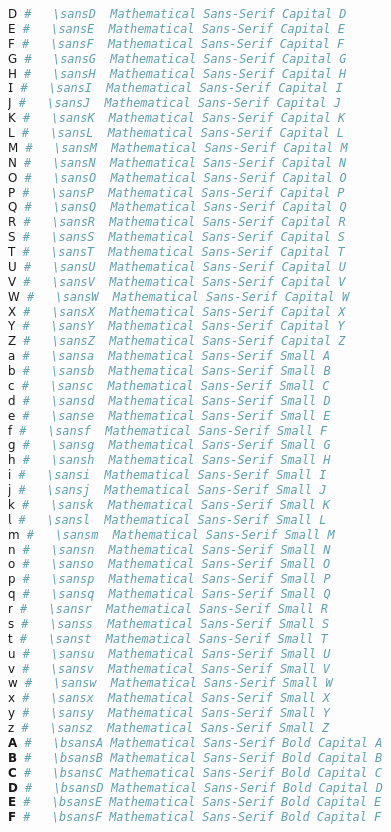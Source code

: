 \begin{lstlisting}[language=Julia]
𝖣 #   \sansD  Mathematical Sans-Serif Capital D
𝖤 #   \sansE  Mathematical Sans-Serif Capital E
𝖥 #   \sansF  Mathematical Sans-Serif Capital F
𝖦 #   \sansG  Mathematical Sans-Serif Capital G
𝖧 #   \sansH  Mathematical Sans-Serif Capital H
𝖨 #   \sansI  Mathematical Sans-Serif Capital I
𝖩 #   \sansJ  Mathematical Sans-Serif Capital J
𝖪 #   \sansK  Mathematical Sans-Serif Capital K
𝖫 #   \sansL  Mathematical Sans-Serif Capital L
𝖬 #   \sansM  Mathematical Sans-Serif Capital M
𝖭 #   \sansN  Mathematical Sans-Serif Capital N
𝖮 #   \sansO  Mathematical Sans-Serif Capital O
𝖯 #   \sansP  Mathematical Sans-Serif Capital P
𝖰 #   \sansQ  Mathematical Sans-Serif Capital Q
𝖱 #   \sansR  Mathematical Sans-Serif Capital R
𝖲 #   \sansS  Mathematical Sans-Serif Capital S
𝖳 #   \sansT  Mathematical Sans-Serif Capital T
𝖴 #   \sansU  Mathematical Sans-Serif Capital U
𝖵 #   \sansV  Mathematical Sans-Serif Capital V
𝖶 #   \sansW  Mathematical Sans-Serif Capital W
𝖷 #   \sansX  Mathematical Sans-Serif Capital X
𝖸 #   \sansY  Mathematical Sans-Serif Capital Y
𝖹 #   \sansZ  Mathematical Sans-Serif Capital Z
𝖺 #   \sansa  Mathematical Sans-Serif Small A
𝖻 #   \sansb  Mathematical Sans-Serif Small B
𝖼 #   \sansc  Mathematical Sans-Serif Small C
𝖽 #   \sansd  Mathematical Sans-Serif Small D
𝖾 #   \sanse  Mathematical Sans-Serif Small E
𝖿 #   \sansf  Mathematical Sans-Serif Small F
𝗀 #   \sansg  Mathematical Sans-Serif Small G
𝗁 #   \sansh  Mathematical Sans-Serif Small H
𝗂 #   \sansi  Mathematical Sans-Serif Small I
𝗃 #   \sansj  Mathematical Sans-Serif Small J
𝗄 #   \sansk  Mathematical Sans-Serif Small K
𝗅 #   \sansl  Mathematical Sans-Serif Small L
𝗆 #   \sansm  Mathematical Sans-Serif Small M
𝗇 #   \sansn  Mathematical Sans-Serif Small N
𝗈 #   \sanso  Mathematical Sans-Serif Small O
𝗉 #   \sansp  Mathematical Sans-Serif Small P
𝗊 #   \sansq  Mathematical Sans-Serif Small Q
𝗋 #   \sansr  Mathematical Sans-Serif Small R
𝗌 #   \sanss  Mathematical Sans-Serif Small S
𝗍 #   \sanst  Mathematical Sans-Serif Small T
𝗎 #   \sansu  Mathematical Sans-Serif Small U
𝗏 #   \sansv  Mathematical Sans-Serif Small V
𝗐 #   \sansw  Mathematical Sans-Serif Small W
𝗑 #   \sansx  Mathematical Sans-Serif Small X
𝗒 #   \sansy  Mathematical Sans-Serif Small Y
𝗓 #   \sansz  Mathematical Sans-Serif Small Z
𝗔 #   \bsansA Mathematical Sans-Serif Bold Capital A
𝗕 #   \bsansB Mathematical Sans-Serif Bold Capital B
𝗖 #   \bsansC Mathematical Sans-Serif Bold Capital C
𝗗 #   \bsansD Mathematical Sans-Serif Bold Capital D
𝗘 #   \bsansE Mathematical Sans-Serif Bold Capital E
𝗙 #   \bsansF Mathematical Sans-Serif Bold Capital F

\end{lstlisting}
